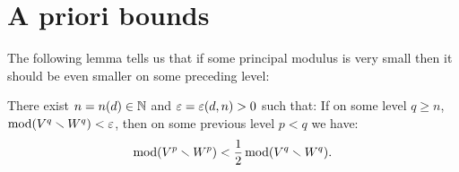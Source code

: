 
\section{A priori bounds}

The following  lemma tells us that if some principal  modulus is very small then it
should be even smaller on some preceding level:

\begin{lem}\label{growth-lem}
There exist $n=n(d)\in {\Bbb N}$ and ${\varepsilon}={\varepsilon}(d,n)>0$  such that: 
If on some level $q\geq n$, $  \operatorname{mod}( V^q\smallsetminus W^q ) <{\varepsilon} $, 
then on some previous level $p<q$ we have:
\begin{equation}\label{decrease}
    \operatorname{mod}  (V^p \smallsetminus W^p) <  \frac{1}{2} \operatorname{mod}( V^q\smallsetminus W^q ).   
\end{equation}
\end{lem}

